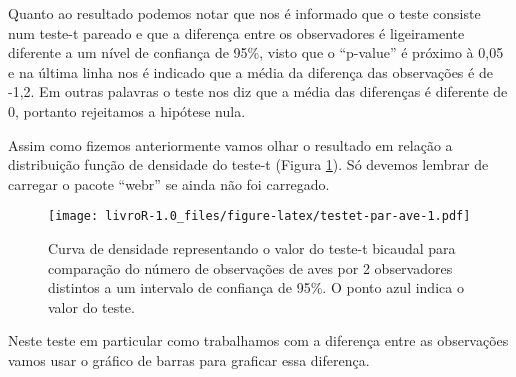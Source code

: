 \documentclass[]{book}
\newenvironment{Shaded}{\begin{snugshade}}{\end{snugshade}}
\newcommand{\DataTypeTok}[1]{\textcolor[rgb]{0.13,0.29,0.53}{#1}}
\newcommand{\DecValTok}[1]{\textcolor[rgb]{0.00,0.00,0.81}{#1}}
\newcommand{\FloatTok}[1]{\textcolor[rgb]{0.00,0.00,0.81}{#1}}
\newcommand{\KeywordTok}[1]{\textcolor[rgb]{0.13,0.29,0.53}{\textbf{#1}}}
\newcommand{\NormalTok}[1]{#1}
\newcommand{\OperatorTok}[1]{\textcolor[rgb]{0.81,0.36,0.00}{\textbf{#1}}}
\newcommand{\OtherTok}[1]{\textcolor[rgb]{0.56,0.35,0.01}{#1}}
\newcommand{\StringTok}[1]{\textcolor[rgb]{0.31,0.60,0.02}{#1}}
\begin{document}
Quanto ao resultado podemos notar que nos é informado que o teste consiste num teste-t pareado e que a diferença entre os observadores é ligeiramente diferente a um nível de confiança de 95\%, visto que o ``p-value'' é próximo à 0,05 e na última linha nos é indicado que a média da diferença das observações é de -1,2. Em outras palavras o teste nos diz que a média das diferenças é diferente de 0, portanto rejeitamos a hipótese nula.

Assim como fizemos anteriormente vamos olhar o resultado em relação a distribuição função de densidade do teste-t (Figura \ref{fig:testet-par-ave}). Só devemos lembrar de carregar o pacote ``webr'' se ainda não foi carregado.

\begin{Shaded}
\end{Shaded}

\begin{figure}
\centering
\texttt{[image: livroR-1.0\_files/figure-latex/testet-par-ave-1.pdf]}
\caption{\label{fig:testet-par-ave}Curva de densidade representando o valor do teste-t bicaudal para comparação do número de observações de aves por 2 observadores distintos a um intervalo de confiança de 95\%. O ponto azul indica o valor do teste.}
\end{figure}

Neste teste em particular como trabalhamos com a diferença entre as observações vamos usar o gráfico de barras para graficar essa diferença.

\begin{Shaded}
\end{Shaded}
\end{document}
